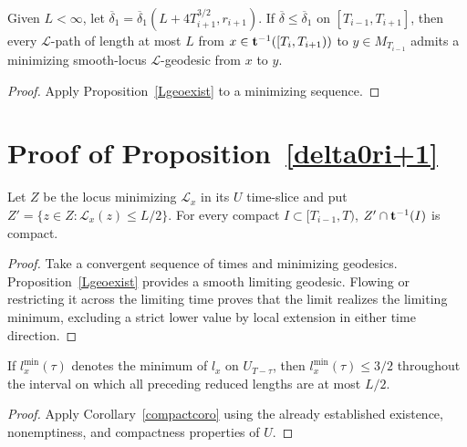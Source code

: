 \begin{corollary}
\label{cor:minimizing-geodesic-to-earlier-slice}
\label{bardelta1}
Given $L<\infty$, let $\overline\delta_1=\overline\delta_1(L+4T_{i+1}^{3/2},r_{i+1})$. If $\overline\delta\leq\overline\delta_1$ on $[T_{i-1},T_{i+1}]$, then every $\mathcal L$-path of length at most $L$ from $x\in{\bf t}^{-1}([T_i,T_{i+1}))$ to $y\in M_{T_{i-1}}$ admits a minimizing smooth-locus $\mathcal L$-geodesic from $x$ to $y$.
\end{corollary}
\begin{proof}
\sketch Apply Proposition~\ref{Lgeoexist} to a minimizing sequence.
\end{proof}

\section{Proof of Proposition~\ref{delta0ri+1}}

\begin{claim}
\label{claim:Z-prime-compact}
Let $Z$ be the locus minimizing $\mathcal L_x$ in its $U$ time-slice and put $Z'=\{z\in Z:\mathcal L_x(z)\leq L/2\}$. For every compact $I\subset[T_{i-1},T)$, $Z'\cap{\bf t}^{-1}(I)$ is compact.
\end{claim}
\begin{proof}
\sketch Take a convergent sequence of times and minimizing geodesics. Proposition~\ref{Lgeoexist} provides a smooth limiting geodesic. Flowing or restricting it across the limiting time proves that the limit realizes the limiting minimum, excluding a strict lower value by local extension in either time direction.
\end{proof}

\begin{lemma}
\label{lem:reduced-length-min-bound-3-2}\label{lvalue}
If $l_x^{\mathrm{min}}(\tau)$ denotes the minimum of $l_x$ on $U_{T-\tau}$, then $l_x^{\mathrm{min}}(\tau)\leq3/2$ throughout the interval on which all preceding reduced lengths are at most $L/2$.
\end{lemma}
\begin{proof}
\sketch
{}
Apply Corollary~\ref{compactcoro} using the already established existence, nonemptiness, and compactness properties of $U$.
\end{proof}

